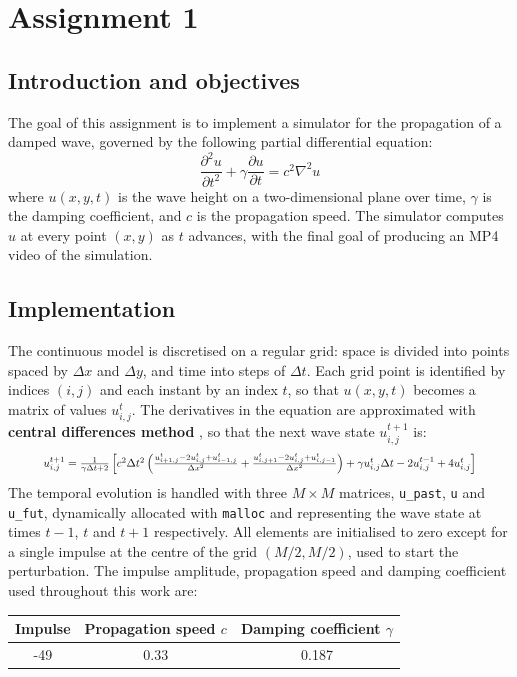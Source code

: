 \section{Assignment 1}
\subsection{Introduction and objectives}
The goal of this assignment is to implement a simulator for the
propagation of a damped wave, governed by the following partial
differential equation:
\begin{equation}
    \frac{\partial^{2}u}{\partial t^{2}}+\gamma\frac{\partial u}{\partial t}=c^{2}\nabla^{2}u
\end{equation}
where $u(x,y,t)$ is the wave height on a two-dimensional plane over
time, $\gamma$ is the damping coefficient, and $c$ is the propagation
speed. The simulator computes $u$ at every point $(x,y)$ as $t$
advances, with the final goal of producing an MP4 video of the
simulation.

\subsection{Implementation}
The continuous model is discretised on a regular grid: space is divided
into points spaced by $\Delta x$ and $\Delta y$, and time into steps of
$\Delta t$. Each grid point is identified by indices $(i,j)$ and each
instant by an index $t$, so that $u(x,y,t)$ becomes a matrix of values
$u_{i,j}^{t}$. The derivatives in the equation are approximated with \textbf{central differences method} \cite{finitedifference}, so that the next wave state $u_{i,j}^{t+1}$ is:
\begin{equation}
    \resizebox{0.9\textwidth}{!}{$
        u_{i,j}^{t+1} = \frac{1}{\gamma \Delta t + 2} \left[ c^2 \Delta t^2 \left( \frac{u_{i+1,j}^t - 2u_{i,j}^t + u_{i-1,j}^t}{\Delta x^2} + \frac{u_{i,j+1}^t - 2u_{i,j}^t + u_{i,j-1}^t}{\Delta x^2} \right) + \gamma u_{i,j}^t \Delta t - 2u_{i,j}^{t-1} + 4u_{i,j}^t \right]
    $}
\end{equation}
The temporal evolution is handled with three $M \times M$ matrices,
\texttt{u\_past}, \texttt{u} and \texttt{u\_fut}, dynamically allocated
with \texttt{malloc} and representing the wave state at times $t-1$, $t$
and $t+1$ respectively. All elements are initialised to zero except for a
single impulse at the centre of the grid $(M/2, M/2)$, used to start the
perturbation. The impulse amplitude, propagation speed and damping
coefficient used throughout this work are:
\begin{center}
    \begin{tabular}{|c|c|c|}
    \hline
    \textbf{Impulse} & \textbf{Propagation speed $c$} & \textbf{Damping coefficient $\gamma$} \\
    \hline
    -49 & 0.33 & 0.187 \\
    \hline
    \end{tabular}
\end{center}


